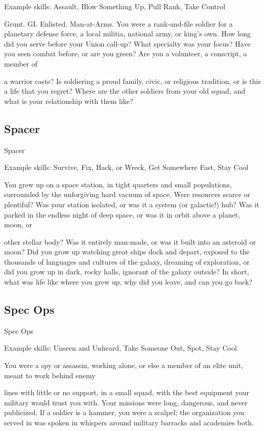 Example skills: Assault, Blow Something Up, Pull Rank, Take Control

Grunt. GI. Enlisted. Man-at-Arms. You were a rank-and-file soldier for a planetary defense force, a local
militia, national army, or king’s own. How long did you serve before your Union call-up? What specialty was
your focus? Have you seen combat before, or are you green? Are you a volunteer, a conscript, a member of

a warrior caste? Is soldiering a proud family, civic, or religious tradition, or is this a life that you regret?
Where are the other soldiers from your old squad, and what is your relationship with them like?

\subsection{Spacer}
                                                       Spacer


Example skills: Survive, Fix, Hack, or Wreck, Get Somewhere Fast, Stay Cool

You grew up on a space station, in tight quarters and small populations, surrounded by the unforgiving hard
vacuum of space. Were resources scarce or plentiful? Was your station isolated, or was it a system (or
galactic!) hub? Was it parked in the endless night of deep space, or was it in orbit above a planet, moon, or

other stellar body? Was it entirely man-made, or was it built into an asteroid or moon? Did you grow up
watching great ships dock and depart, exposed to the thousands of languages and cultures of the galaxy,
dreaming of exploration, or did you grow up in dark, rocky halls, ignorant of the galaxy outside? In short,
what was life like where you grew up, why did you leave, and can you go back?

\subsection{Spec Ops}
                                                     Spec Ops

Example skills: Unseen and Unheard, Take Someone Out, Spot, Stay Cool

You were a spy or assassin, working alone, or else a member of an elite unit, meant to work behind enemy

lines with little or no support, in a small squad, with the best equipment your military would trust you with.
Your missions were long, dangerous, and never publicized. If a soldier is a hammer, you were a scalpel; the
organization you served in was spoken in whispers around military barracks and academies both.

